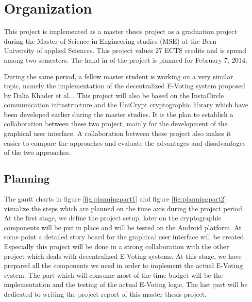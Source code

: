 \documentclass[numbers=noenddot, abstract=on, a4paper, headsepline,
footsepline, oneside, draft=off]{scrreprt}
\begin{document}
\chapter{Organization}
\label{cha:organization}
This project is implemented as a master thesis project as a graduation project
during the Master of Science in Engineering studies (MSE) at the Bern University
of applied Sciences. This project values 27 ECTS credits and is spread among two
semesters. The hand in of the project is planned for February 7, 2014.

During the same period, a fellow master student is working on a very similar
topic, namely the implementation of the decentralized E-Voting system proposed by
Dalia Khader et al. \cite{HKRS12}. This project will also be based on the
InstaCircle communication infrastructure \cite{ritter13a} and the UniCrypt
cryptographic library \cite{ritter12} which have been developed earlier during
the master studies. It is the plan to establish a collaboration between these
two project, mainly for the development of the graphical user interface. A
collaboration between these project also makes it easier to compare the
approaches and evaluate the advantages and disadvantages of the two approaches.

\section{Planning}
\label{sec:planning}
The gantt charts in figure \ref{fig:planningpart1} and figure
\ref{fig:planningpart2} visualize the steps which are planned on the time axis
during the project period. At the first stage, we define the project setup,
later on the cryptographic components will be put in place and will be tested on
the Android platform. At some point a detailed story board for the graphical
user interface will be created. Especially this project will be done in a strong
collaboration with the other project which deals with decentralized E-Voting
systems. At this stage, we have prepared all the components we need in order to
implement the actual E-Voting system. The part which will consume most of the
time budget will be the implementation and the testing of the actual E-Voting
logic. The last part will be dedicated to writing the project report of this
master thesis project.
\end{document}
